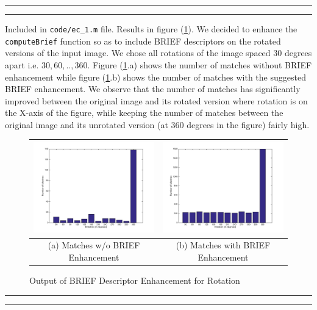 \documentclass[12pt]{article}\sloppy
\newcommand{\question}[2] {\vspace{.25in} \hrule\vspace{0.5em} \noindent{\bf #1: #2} \vspace{0.5em} \hrule \vspace{.10in}}
\begin{document}
\question{7.1}{ec\_1}

Included in \texttt{code/ec\_1.m} file. Results in figure (\ref{fig:briefrotationenhancement}). We decided to enhance the \texttt{computeBrief} function so as to include BRIEF descriptors on the rotated versions of the input image. We chose all rotations of the image spaced 30 degrees apart i.e. $30, 60, .., 360$. Figure (\ref{fig:briefrotationenhancement}.a) shows the number of matches without BRIEF enhancement while figure (\ref{fig:briefrotationenhancement}.b) shows the number of matches with the suggested BRIEF enhancement. We observe that the number of matches has significantly improved between the original image and its rotated version where rotation is on the X-axis of the figure, while keeping the number of matches between the original image and its unrotated version (at 360 degrees in the figure) fairly high.

\begin{figure}[f]
\centering
\begin{tabular}{| c | c |}
  \hline
  \includegraphics[width=0.42\linewidth]{../results/EC1_RotationError_1.jpg} & \includegraphics[width=0.42\linewidth]{../results/EC1_RotationError_2.jpg} \\
  \hline
  (a) Matches w/o BRIEF Enhancement & (b) Matches with BRIEF Enhancement \\
  \hline
\end{tabular}
\caption{Output of BRIEF Descriptor Enhancement for Rotation}
\label{fig:briefrotationenhancement}
\end{figure}

\question{7.2}{ec\_2}
\end{document}
